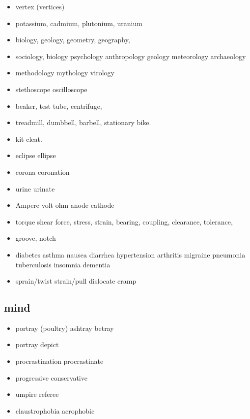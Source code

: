 \documentclass[a4paper,11pt,twoside]{book}
\begin{document}
\begin{itemize}
	\item vertex (vertices)
	
	\item potassium, cadmium, plutonium, uranium
	
	\item biology, geology, geometry, geography,
	
	\item sociology, biology psychology anthropology geology meteorology archaeology
	
	
	\item methodology mythology virology
	
	\item stethoscope oscilloscope 
	\item beaker, test tube, centrifuge,  
	
	\item treadmill, dumbbell, barbell, stationary bike. 
	\item kit cleat.
	
	
	\item eclipse ellipse
	
	\item corona coronation
	
	\item urine urinate
	
	\item Ampere volt ohm anode cathode 
	
	\item torque shear force, stress, strain,  bearing, coupling, clearance, tolerance, 
	
	\item groove, notch 
	
	\item diabetes asthma nausea diarrhea hypertension arthritis migraine pneumonia tuberculosis insomnia dementia 
	
	\item sprain/twist strain/pull dislocate cramp
	
	
\end{itemize}

\subsection{mind}
\begin{itemize}
	\item portray (poultry) ashtray betray 
	
	\item portray depict
	
	\item procrastination procrastinate
	
	\item progressive conservative  
	
	\item umpire referee
	
	\item claustrophobia acrophobic
	
\end{itemize}
\end{document}
